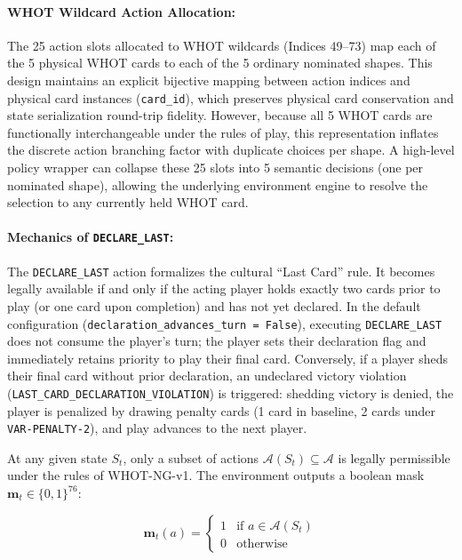 \documentclass[11pt]{article}
\begin{document}
\paragraph{WHOT Wildcard Action Allocation:}
The 25 action slots allocated to WHOT wildcards (Indices 49--73) map each of the 5 physical WHOT cards to each of the 5 ordinary nominated shapes. This design maintains an explicit bijective mapping between action indices and physical card instances (\texttt{card\_id}), which preserves physical card conservation and state serialization round-trip fidelity. However, because all 5 WHOT cards are functionally interchangeable under the rules of play, this representation inflates the discrete action branching factor with duplicate choices per shape. A high-level policy wrapper can collapse these 25 slots into 5 semantic decisions (one per nominated shape), allowing the underlying environment engine to resolve the selection to any currently held WHOT card.

\paragraph{Mechanics of \texttt{DECLARE\_LAST}:}
The \texttt{DECLARE\_LAST} action formalizes the cultural ``Last Card'' rule. It becomes legally available if and only if the acting player holds exactly two cards prior to play (or one card upon completion) and has not yet declared. In the default configuration (\texttt{declaration\_advances\_turn = False}), executing \texttt{DECLARE\_LAST} does not consume the player's turn; the player sets their declaration flag and immediately retains priority to play their final card. Conversely, if a player sheds their final card without prior declaration, an undeclared victory violation (\texttt{LAST\_CARD\_DECLARATION\_VIOLATION}) is triggered: shedding victory is denied, the player is penalized by drawing penalty cards (1 card in baseline, 2 cards under \texttt{VAR-PENALTY-2}), and play advances to the next player.

At any given state $S_t$, only a subset of actions $\mathcal{A}(S_t) \subseteq \mathcal{A}$ is legally permissible under the rules of WHOT-NG-v1. The environment outputs a boolean mask $\mathbf{m}_t \in \{0, 1\}^{76}$:

\[
\mathbf{m}_t(a) = \begin{cases} 1 & \text{if } a \in \mathcal{A}(S_t) \\ 0 & \text{otherwise} \end{cases}
\]
\end{document}
